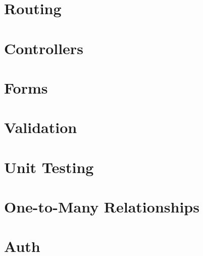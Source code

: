 \documentclass[b5paper,openany]{book}
\begin{document}
\chapter{Routing}


\chapter{Controllers}


\chapter{Forms}


\chapter{Validation}


\chapter{Unit Testing}


\chapter{One-to-Many Relationships}


\chapter{Auth}








\end{document}
